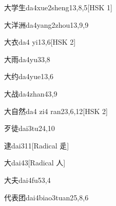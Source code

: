 \begin{entry}{大学生}{da4xue2sheng1}{3,8,5}[HSK 1]
\end{entry}

\begin{entry}{大洋洲}{da4yang2zhou1}{3,9,9}
\end{entry}

\begin{entry}{大衣}{da4 yi1}{3,6}[HSK 2]
\end{entry}

\begin{entry}{大雨}{da4yu3}{3,8}
\end{entry}

\begin{entry}{大约}{da4yue1}{3,6}
\end{entry}

\begin{entry}{大战}{da4zhan4}{3,9}
\end{entry}

\begin{entry}{大自然}{da4 zi4 ran2}{3,6,12}[HSK 2]
\end{entry}

\begin{entry}{歹徒}{dai3tu2}{4,10}
\end{entry}

\begin{entry}{逮}{dai3}{11}[Radical 辵]
\end{entry}

\begin{entry}{大}{dai4}{3}[Radical ⼈]
\end{entry}

\begin{entry}{大夫}{dai4fu5}{3,4}
\end{entry}

\begin{entry}{代表团}{dai4biao3tuan2}{5,8,6}
\end{entry}


